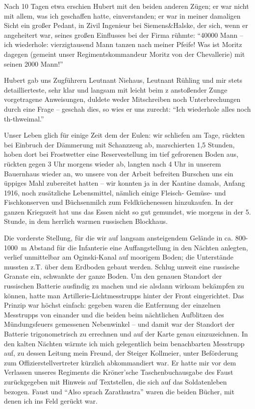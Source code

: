 Nach 10 Tagen etwa erschien Hubert mit den beiden anderen Zügen; er war nicht mit allem, was ich geschaffen hatte, einverstanden; er war in meiner damaligen Sicht ein großer Pedant, in Zivil Ingenieur bei Siemens\&Halske, der sich, wenn er angeheitert war, seines großen Einflusses bei der Firma rühmte: \enquote{\num{40000} Mann -- ich wiederhole: vierzigtausend Mann tanzen nach meiner Pfeife! Was ist Moritz dagegen (gemeint unser Regimentskommandeur Moritz von der Chevallerie) mit seinen \num{2000} Mann!}

Hubert gab uns Zugführern Leutnant Niehaus, Leutnant Rühling und mir stets detaillierteste, sehr klar und langsam mit leicht beim z anstoßender Zunge vorgetragene Anweisungen, duldete weder Mitschreiben noch Unterbrechungen durch eine Frage -- geschah dies, so wies er uns zurecht: \enquote{Ich wiederhole alles noch th-thweimal.}

Unser Leben glich für einige Zeit dem der Eulen: wir schliefen am Tage, rückten bei Einbruch der Dämmerung mit Schanzzeug ab, marschierten 1,5 Stunden, hoben dort bei Frostwetter eine Reservestellung im tief gefrorenen Boden aus, rückten gegen 3 Uhr morgens wieder ab, langten nach 4 Uhr in unserem Bauernhaus wieder an, wo unsere von der Arbeit befreiten Burschen uns ein üppiges Mahl zubereitet hatten -- wir konnten ja in der Kantine damals, Anfang 1916, noch zusätzliche Lebensmittel, nämlich einige Fleisch- Gemüse- und Fischkonserven und Büchsenmilch zum Feldküchenessen hinzukaufen. In der ganzen Kriegszeit hat uns das Essen nicht so gut gemundet, wie morgens in der 5. Stunde, in dem herrlich warmen russischen Blockhaus.

Die vorderste Stellung, für die wir auf langsam ansteigendem Gelände in ca. 800-1000~m Abstand für die Infanterie eine Auffangstellung in den Nächten anlegten, verlief unmittelbar am Oginski-Kanal auf moorigem Boden; die Unterstände mussten z.T. über dem Erdboden gebaut werden. Schlug unweit eine russische Granate ein, schwankte der ganze Boden. Um den genauen Standort der russischen Batterie ausfindig zu machen und sie alsdann wirksam bekämpfen zu können, hatte man Artillerie-Lichtmesstrupps hinter der Front eingerichtet. Das Prinzip war höchst einfach: gegeben waren die Entfernung der einzelnen Messtrupps von einander und die beiden beim nächtlichen Aufblitzen des Mündungsfeuers gemessenen Nebenwinkel -- und damit war der Standort der Batterie trigonometrisch zu errechnen und auf der Karte genau einzuzeichnen. In den kalten Nächten wärmte ich mich gelegentlich beim benachbarten Messtrupp auf, zu dessen Leitung mein Freund, der Steiger Kollmeier, unter Beförderung zum Offizierstellvertreter kürzlich abkommandiert war. Er hatte mir vor dem Verlassen unseres Regiments die Kröner'sche Taschenbuchausgabe des Faust zurückgegeben mit Hinweis auf Textstellen, die sich auf das Soldatenleben bezogen. Faust und \enquote{Also sprach Zarathustra} waren die beiden Bücher, mit denen ich ins Feld gerückt war.

